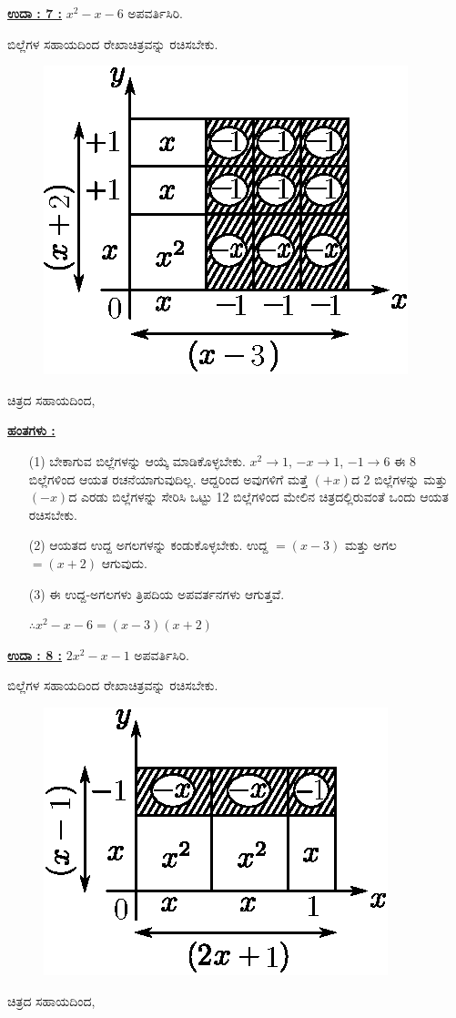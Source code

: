 \noindent
{\textbf{\underline{ಉದಾ : 7 :}}} $x^2 - x - 6$ ಅಪವರ್ತಿಸಿರಿ. 

ಬಿಲ್ಲೆಗಳ ಸಹಾಯದಿಂದ ರೇಖಾಚಿತ್ರವನ್ನು ರಚಿಸಬೇಕು.
\begin{figure}[H]
\centering
\includegraphics[scale=0.8]{src/figure/chap3/fig3-45.eps}
\end{figure}
ಚಿತ್ರದ ಸಹಾಯದಿಂದ,

\noindent
{\textbf{\underline{ಹಂತಗಳು :}}}
\begin{itemize}
\item [(1)] ಬೇಕಾಗುವ ಬಿಲ್ಲೆಗಳನ್ನು ಆಯ್ಕೆ ಮಾಡಿಕೊಳ್ಳಬೇಕು. $x^2 \rightarrow 1$, $-x \rightarrow 1$, $-1 \rightarrow 6$ ಈ 8 ಬಿಲ್ಲೆಗಳಿಂದ ಆಯತ ರಚನೆಯಾಗುವುದಿಲ್ಲ. ಆದ್ದರಿಂದ ಅವುಗಳಿಗೆ ಮತ್ತೆ $(+x)$ದ 2 ಬಿಲ್ಲೆಗಳನ್ನು ಮತ್ತು $(-x)$ದ ಎರಡು ಬಿಲ್ಲೆಗಳನ್ನು ಸೇರಿಸಿ ಒಟ್ಟು 12 ಬಿಲ್ಲೆಗಳಿಂದ ಮೇಲಿನ ಚಿತ್ರದಲ್ಲಿರುವಂತೆ ಒಂದು ಆಯತ ರಚಿಸಬೇಕು. 
\item [(2)] ಆಯತದ ಉದ್ದ ಅಗಲಗಳನ್ನು ಕಂಡುಕೊಳ್ಳಬೇಕು. ಉದ್ದ $= (x-3)$ ಮತ್ತು ಅಗಲ $= (x + 2)$ ಆಗುವುದು. 
\item [(3)] ಈ ಉದ್ದ-ಅಗಲಗಳು ತ್ರಿಪದಿಯ ಅಪವರ್ತನಗಳು ಆಗುತ್ತವೆ.

$\therefore x^2 - x - 6 = (x - 3)(x+2)$
\end{itemize}

\eject

\noindent
{\textbf{\underline{ಉದಾ : 8 :}}} $2x^2 - x - 1$ ಅಪವರ್ತಿಸಿರಿ. 

ಬಿಲ್ಲೆಗಳ ಸಹಾಯದಿಂದ ರೇಖಾಚಿತ್ರವನ್ನು ರಚಿಸಬೇಕು.
\begin{figure}[H]
\centering
\includegraphics[scale=0.8]{src/figure/chap3/fig3-46.eps}
\end{figure}
ಚಿತ್ರದ ಸಹಾಯದಿಂದ,

